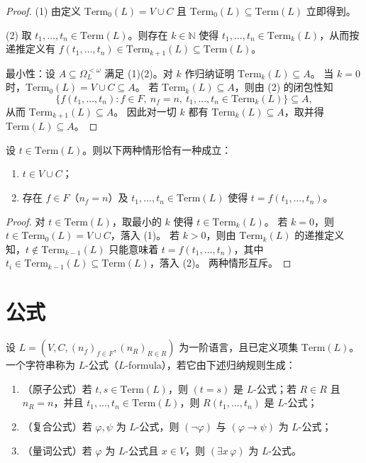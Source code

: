 \documentclass[lang=cn,a4paper,newtx,section]{elegantbook}
\begin{document}
\begin{proof}
(1) 由定义 $\mathrm{Term}_0(L)=V\cup C$ 且 $\mathrm{Term}_0(L)\subseteq \mathrm{Term}(L)$ 立即得到。

(2) 取 $t_1,\dots,t_n\in\mathrm{Term}(L)$。则存在 $k\in\mathbb N$ 使得 $t_1,\dots,t_n\in\mathrm{Term}_k(L)$，从而按递推定义有 $f(t_1,\dots,t_n)\in\mathrm{Term}_{k+1}(L)\subseteq\mathrm{Term}(L)$。

最小性：设 $A\subseteq\Omega_L^{<\omega}$ 满足 (1)(2)。对 $k$ 作归纳证明 $\mathrm{Term}_k(L)\subseteq A$。
当 $k=0$ 时，$\mathrm{Term}_0(L)=V\cup C\subseteq A$。
若 $\mathrm{Term}_k(L)\subseteq A$，则由 (2) 的闭包性知
\[
  \{f(t_1,\dots,t_n): f\in F,\ n_f=n,\ t_1,\dots,t_n\in\mathrm{Term}_k(L)\}\subseteq A,
\]
从而 $\mathrm{Term}_{k+1}(L)\subseteq A$。
因此对一切 $k$ 都有 $\mathrm{Term}_k(L)\subseteq A$，取并得 $\mathrm{Term}(L)\subseteq A$。
\end{proof}

\begin{lemma}
设 $t\in\mathrm{Term}(L)$。则以下两种情形恰有一种成立：
\begin{enumerate}
  \item $t\in V\cup C$；
  \item 存在 $f\in F$（$n_f=n$）及 $t_1,\dots,t_n\in\mathrm{Term}(L)$ 使得 $t=f(t_1,\dots,t_n)$。
\end{enumerate}
\end{lemma}

\begin{proof}
对 $t\in\mathrm{Term}(L)$，取最小的 $k$ 使得 $t\in\mathrm{Term}_k(L)$。
若 $k=0$，则 $t\in\mathrm{Term}_0(L)=V\cup C$，落入 (1)。
若 $k>0$，则由 $\mathrm{Term}_k(L)$ 的递推定义知，$t\notin\mathrm{Term}_{k-1}(L)$ 只能意味着 $t=f(t_1,\dots,t_n)$，其中 $t_i\in\mathrm{Term}_{k-1}(L)\subseteq\mathrm{Term}(L)$，落入 (2)。
两种情形互斥。
\end{proof}

\section{公式}

\begin{definition}[$L$-公式]
设 $L=(V,C,(n_f)_{f\in F},(n_R)_{R\in R})$ 为一阶语言，且已定义项集 $\mathrm{Term}(L)$。
一个字符串称为 $L$-公式（$L$-formula），若它由下述归纳规则生成：
\begin{enumerate}
  \item （原子公式）若 $t,s\in\mathrm{Term}(L)$，则 $(t=s)$ 是 $L$-公式；若 $R\in R$ 且 $n_R=n$，并且 $t_1,\dots,t_n\in\mathrm{Term}(L)$，则 $R(t_1,\dots,t_n)$ 是 $L$-公式；
  \item （复合公式）若 $\varphi,\psi$ 为 $L$-公式，则 $(\neg\varphi)$ 与 $(\varphi\to\psi)$ 为 $L$-公式；
  \item （量词公式）若 $\varphi$ 为 $L$-公式且 $x\in V$，则 $(\exists x\,\varphi)$ 为 $L$-公式。
\end{enumerate}
\end{definition}
\end{document}
